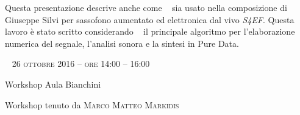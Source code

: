\begin{flushleft}
Questa presentazione descrive anche come \pa ~ sia usato nella composizione di Giuseppe Silvi per sassofono aumentato ed elettronica dal vivo \emph{S4EF}. Questa lavoro \`e stato scritto considerando \pa ~ il principale algoritmo per l'elaborazione numerica del segnale, l'analisi sonora e la sintesi in Pure Data. 





~\vfill
\large{
	\scshape{
	26 ottobre 2016 -- ore 14:00 -- 16:00
	}}

\medskip
	
\small{Workshop
	\newline Aula Bianchini}

\medskip

{\fontsize{42}{42} }

\normalfont

\normalsize


\bigskip

Workshop tenuto da \textsc{Marco Matteo Markidis}

\bigskip


\end{flushleft}
